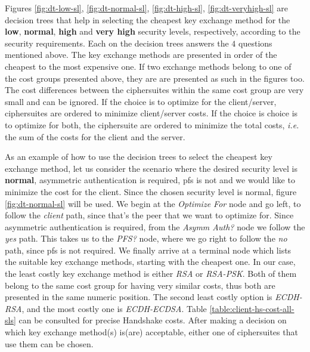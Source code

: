 Figures \ref{fig:dt-low-sl}, \ref{fig:dt-normal-sl}, \ref{fig:dt-high-sl}, \ref{fig:dt-veryhigh-sl} are decision trees that
help in selecting the cheapest key exchange method for the \textbf{low}, \textbf{normal}, \textbf{high} and \textbf{very high}
security levels, respectively, according to the security requirements. Each on the decision trees answers the $4$ questions
mentioned above. The key exchange methods are presented in order of the cheapest to the most expensive one. If two exchange methods
belong to one of the cost groups presented above, they are are presented as such in the figures too. The cost differences between
the ciphersuites within the same cost group are very small and can be ignored. If the choice is to optimize for the client/server,
ciphersuites are ordered to minimize client/server costs. If the choice is choice is to optimize for both, the
ciphersuite are ordered to minimize the total costs, \textit{i.e.} the sum of the costs for the client and the server.

As an example of how to use the decision trees to select the cheapest key exchange method, let us consider the scenario
where the desired security level is \textbf{normal}, asymmetric authentication is required, \gls{pfs} is not and we would like to
minimize the cost for the client. Since the chosen security level is normal, figure \ref{fig:dt-normal-sl} will be used.
We begin at the \textit{Optimize For} node and go left, to follow the \textit{client} path, since that's the peer that we
want to optimize for. Since asymmetric authentication is required, from the \textit{Asymm Auth?} node we follow the \textit{yes}
path. This takes us to the \textit{PFS?} node, where we go right to follow the \textit{no} path, since \gls{pfs} is not required.
We finally arrive at a terminal node which lists the suitable key exchange methods, starting with the cheapest one.
In our case, the least costly key exchange method is either \textit{RSA} or \textit{RSA-PSK}. Both of them belong to the same
cost group for having very similar costs, thus both are presented in the same numeric position. The second least costly option
is \textit{ECDH-RSA}, and the most costly one is \textit{ECDH-ECDSA}. Table \ref{table:client-hs-cost-all-sls} can be consulted for
precise Handshake costs. After making a decision on which key exchange method(s) is(are) acceptable, either one of ciphersuites that
use them can be chosen.

